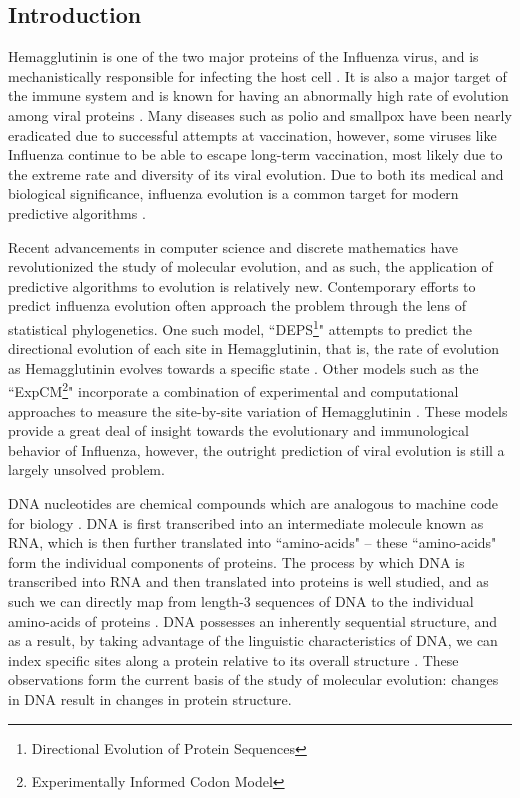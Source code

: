 \documentclass[12pt]{article}
\begin{document}
\begin{multicols}{2}


\section{Introduction}
Hemagglutinin is one of the two major proteins of the Influenza virus, and is mechanistically responsible for infecting the host cell \citep{wiley1987structure}. It is also a major target of the immune system and is known for having an abnormally high rate of evolution among viral proteins \citep{petrova2018evolution}. Many diseases such as polio and smallpox have been nearly eradicated due to successful attempts at vaccination, however, some viruses like Influenza continue to be able to escape long-term vaccination, most likely due to the extreme rate and diversity of its viral evolution. Due to both its medical and biological significance, influenza evolution is a common target for modern predictive algorithms \citep{morris2017predictive}. 

Recent advancements in computer science and discrete mathematics have revolutionized the study of molecular evolution, and as such, the application of predictive algorithms to evolution is relatively new. Contemporary efforts to predict influenza evolution often approach the problem through the lens of statistical phylogenetics. One such model, ``DEPS\footnote{Directional Evolution of Protein Sequences}" attempts to predict the directional evolution of each site in Hemagglutinin, that is, the rate of evolution as Hemagglutinin evolves towards a specific state \citep{kosakovsky2008maximum}. Other models such as the ``ExpCM\footnote{Experimentally Informed Codon Model}" incorporate a combination of experimental and computational approaches to measure the site-by-site variation of Hemagglutinin \citep{bloom2017identification}. These models provide a great deal of insight towards the evolutionary and immunological behavior of Influenza, however, the outright prediction of viral evolution is still a largely unsolved problem.

DNA nucleotides are chemical compounds which are analogous to machine code for biology \citep{hood2003digital}. DNA is first transcribed into an intermediate molecule known as RNA, which is then further translated into ``amino-acids" -- these ``amino-acids" form the individual components of proteins. The process by which DNA is transcribed into RNA and then translated into proteins is well studied, and as such we can directly map from length-3 sequences of DNA to the individual amino-acids of proteins \citep{searls1995string}. DNA possesses an inherently sequential structure, and as a result, by taking advantage of the linguistic characteristics of DNA, we can index specific sites along a protein relative to its overall structure \citep{brendel1986linguistics}. These observations form the current basis of the study of molecular evolution: changes in DNA result in changes in protein structure.


\end{multicols}
\end{document}
